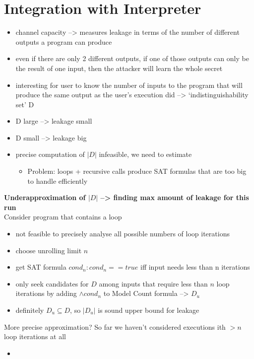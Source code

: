\section{Integration with Interpreter}
\begin{itemize}
    \item channel capacity --> measures leakage in terms of the number of different outputs a program can produce
    \item even if there are only 2 different outputs, if one of those outputs can only be the result of one input, then the attacker will learn the whole secret
    \item interesting for user to know the number of inputs to the program that will produce the same output as the user's execution did --> `indistinguishability set' D
    \item D large --> leakage small
    \item D small --> leakage big
    \item precise computation of $|D|$ infeasible, we need to estimate
    \begin{itemize}
        \item Problem: loops + recursive calls produce SAT formulas that are too big to handle efficiently
    \end{itemize}
\end{itemize}

\textbf{Underapproximation of $|D|$ --> finding max amount of leakage for this run}\\
Consider program that contains a loop
\begin{itemize}
    \item not feasible to precisely analyse all possible numbers of loop iterations
    \item choose unrolling limit $n$
    \item get SAT formula $cond_n: cond_n == true$ iff input needs less than n iterations
    \item only seek candidates for $D$ among inputs that require less than $n$ loop iterations by adding $\land cond_n$ to Model Count formula --> $D_u$
    \item definitely $D_u \subseteq D$, so $|D_u|$ is sound upper bound for leakage
\end{itemize}
More precise approximation? So far we haven't considered executions ith $>n$ loop iterations at all
\begin{itemize}
    \item 
\end{itemize}

